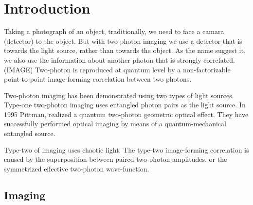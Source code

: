 
\chapter{Introduction} %

\label{Chapter1} %

Taking a photograph of an object, traditionally, we need to face a camara (detector) to the object. But with two-photon imaging 
we use a detector that is towards the light source, rather than towards the object.
As the name suggest it, we also use the information about another photon that is strongly correlated. (IMAGE)
 Two-photon is reproduced at quantum level by a non-factorizable point-to-point image-forming correlation between two photons.

Two-photon imaging has been demonstrated using two types of light sources. Type-one
two-photon imaging uses entangled photon pairs as the light source. In 1995 Pittman, realized a 
quantum two-photon geometric optical effect.  They have successfully performed optical 
imaging by means of a quantum-mechanical entangled source\cite{pittman}.

Type-two of imaging uses chaotic light. The type-two  
image-forming correlation is caused by the superposition between paired two-photon amplitudes,
or the symmetrized effective two-photon wave-function\cite{physicsGhost}.
\section{Imaging}

